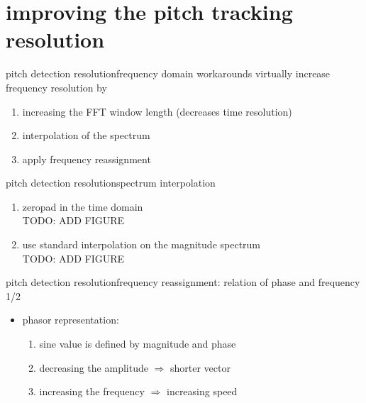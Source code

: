     \section[frequency domain]{improving the pitch tracking resolution}
        \begin{frame}{pitch detection resolution}{frequency domain workarounds}
            virtually increase frequency resolution by
            \bigskip
            \begin{enumerate}
                \item<1->   increasing the FFT window length (decreases time resolution)
                \bigskip
                \item<2->   interpolation of the spectrum
                \bigskip
                \item<3->   apply frequency reassignment
            \end{enumerate}
        \end{frame}
        \begin{frame}{pitch detection resolution}{spectrum interpolation}
            
            \begin{enumerate}
                \item<1->   zeropad in the time domain\\ TODO: ADD FIGURE
                \item<2->   use standard interpolation on the magnitude spectrum\\ TODO: ADD FIGURE
            \end{enumerate}
        \end{frame}
        \begin{frame}{pitch detection resolution}{frequency reassignment: relation of phase and frequency 1/2}
           \begin{itemize}
                \item   phasor representation:
                    \begin{enumerate}
                        \item   sine value is defined by magnitude and phase
                        \item   decreasing the amplitude $\Rightarrow$ shorter vector
                        \item   increasing the frequency $\Rightarrow$ increasing speed
                    \end{enumerate}
            \end{itemize}
        \end{frame}
